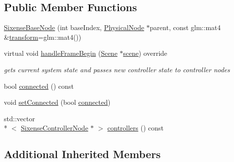 \subsection*{Public Member Functions}
\begin{DoxyCompactItemize}
\item 
\hyperlink{classmotorcar_1_1SixenseBaseNode_a7d0d69617d419cda3837efaa2eaf2d2c}{Sixense\-Base\-Node} (int base\-Index, \hyperlink{classmotorcar_1_1PhysicalNode}{Physical\-Node} $\ast$parent, const glm\-::mat4 \&\hyperlink{classmotorcar_1_1SceneGraphNode_ad96e79fdd739ac8223a3128003be391a}{transform}=glm\-::mat4())
\item 
virtual void \hyperlink{classmotorcar_1_1SixenseBaseNode_a5f211241a5bf54194920582a8bb7e3c3}{handle\-Frame\-Begin} (\hyperlink{classmotorcar_1_1Scene}{Scene} $\ast$\hyperlink{classmotorcar_1_1SceneGraphNode_aa14e637ed4ae98f77e28941a4b5cfdd8}{scene}) override
\begin{DoxyCompactList}\small\item\em gets current system state and passes new controller state to controller nodes \end{DoxyCompactList}\item 
bool \hyperlink{classmotorcar_1_1SixenseBaseNode_a717b0bd837bfaa8a41330ff2e89fe818}{connected} () const 
\item 
void \hyperlink{classmotorcar_1_1SixenseBaseNode_adc93b3ae19192be4d4fbf39bfb5f954b}{set\-Connected} (bool \hyperlink{classmotorcar_1_1SixenseBaseNode_a717b0bd837bfaa8a41330ff2e89fe818}{connected})
\item 
std\-::vector\\*
$<$ \hyperlink{classmotorcar_1_1SixenseControllerNode}{Sixense\-Controller\-Node} $\ast$ $>$ \hyperlink{classmotorcar_1_1SixenseBaseNode_ac15f4bc8939447b77dfeda9749899acc}{controllers} () const 
\end{DoxyCompactItemize}
\subsection*{Additional Inherited Members}


